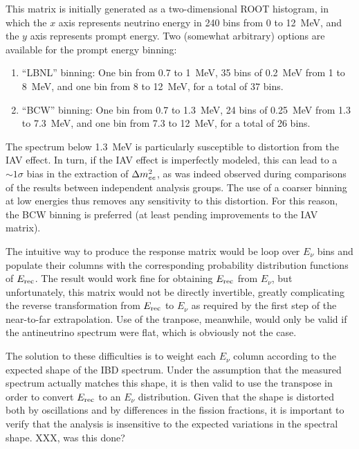 \documentclass[../thesis.tex]{subfiles}
\begin{document}
This matrix is initially generated as a two-dimensional ROOT histogram, in which the $x$ axis represents neutrino energy in 240 bins from 0 to 12~MeV, and the $y$ axis represents prompt energy. Two (somewhat arbitrary) options are available for the prompt energy binning:

\begin{enumerate}
\item ``LBNL'' binning: One bin from 0.7 to 1~MeV, 35 bins of 0.2~MeV from 1 to 8~MeV, and one bin from 8 to 12~MeV, for a total of 37 bins.
\item ``BCW'' binning: One bin from 0.7 to 1.3~MeV, 24 bins of 0.25~MeV from 1.3 to 7.3~MeV, and one bin from 7.3 to 12~MeV, for a total of 26 bins.
\end{enumerate}

The spectrum below 1.3~MeV is particularly susceptible to distortion from the IAV effect. In turn, if the IAV effect is imperfectly modeled, this can lead to a $\sim1\sigma$ bias in the extraction of $\Delta m^2_{ee}$, as was indeed observed during comparisons of the results between independent analysis groups. The use of a coarser binning at low energies thus removes any sensitivity to this distortion. For this reason, the BCW binning is preferred (at least pending improvements to the IAV matrix).

\begin{comment}
  I don't see any reason to mention the fact that a finer binning (2880 instead of 240) is used internally by the toy MC when generating this matrix. With the standard 240 bins, the edges line up with both the LBNL and BCW edges, so there shouldn't be any benefit from using a finer binning.

  deleted: Internally, the toy MC normally represents both neutrino and prompt energy using 240 bins (of 50~keV) from 0 to 12~MeV.
\end{comment}

The intuitive way to produce the response matrix would be loop over $E_\nu$ bins and populate their columns with the corresponding probability distribution functions of $E_\mathrm{rec}$. The result would work fine for obtaining $E_\mathrm{rec}$ from $E_\nu$, but unfortunately, this matrix would not be directly invertible, greatly complicating the reverse transformation from $E_\mathrm{rec}$ to $E_\nu$ as required by the first step of the near-to-far extrapolation. Use of the tranpose, meanwhile, would only be valid if the antineutrino spectrum were flat, which is obviously not the case.

The solution to these difficulties is to weight each $E_\nu$ column according to the expected shape of the IBD spectrum. Under the assumption that the measured spectrum actually matches this shape, it is then valid to use the transpose in order to convert $E_\mathrm{rec}$ to an $E_\nu$ distribution. Given that the shape is distorted both by oscillations and by differences in the fission fractions, it is important to verify that the analysis is insensitive to the expected variations in the spectral shape. XXX, was this done?
\end{document}
